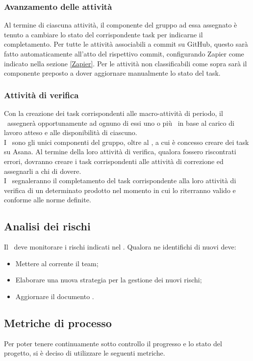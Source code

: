\documentclass[../NormeDiProgetto.tex]{subfiles}
\begin{document}
				\subsubsection{Avanzamento delle attività}
				Al termine di ciascuna attività, il componente del gruppo ad essa assegnato è tenuto a
				cambiare lo stato del corrispondente task per indicarne il completamento.
				Per tutte le attività associabili a commit su GitHub, questo sarà fatto automaticamente
				all'atto del rispettivo commit, configurando Zapier come indicato nella sezione \ref{Zapier}.
				Per le attività non classificabili come sopra sarà il componente preposto a dover
				aggiornare manualmente lo stato del task.
				\subsubsection{Attività di verifica}
				Con la creazione dei task corrispondenti alle macro-attività di periodo, il
				\responsabilediprogetto\ assegnerà opportunamente ad ognuno di essi uno o più \verificatori\
				in base al carico di lavoro atteso e alle disponibilità di ciascuno.\\
				I \verificatori\ sono gli unici componenti del gruppo, oltre al \responsabilediprogetto, a
				cui è concesso creare dei task su Asana. Al termine della loro attività di verifica, qualora
				fossero riscontrati errori, dovranno creare i task corrispondenti alle attività di correzione
				ed assegnarli a chi di dovere.\\
				I \verificatori\ segnaleranno il completamento del task corrispondente alla loro attività di
				verifica di un determinato prodotto nel momento in cui lo riterranno valido e conforme
				alle norme definite.
				\subsection{Analisi dei rischi}
				Il \responsabilediprogetto\ deve monitorare i rischi indicati nel \pianodiprogettov.
				Qualora ne identifichi di nuovi deve:
				\begin{itemize}
					\item Mettere al corrente il team;
					\item Elaborare una nuova strategia per la gestione dei nuovi rischi;
					\item Aggiornare il documento \pianodiprogetto.
				\end{itemize}
			
			\subsection{Metriche di processo}
				Per poter tenere continuamente sotto controllo il progresso e lo stato del progetto,
				si è deciso di utilizzare le seguenti metriche.
\end{document}
